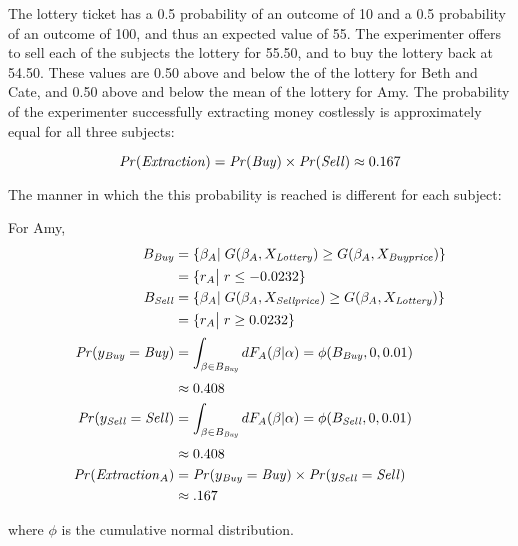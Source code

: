 The lottery ticket has a 0.5 probability of an outcome of 10 and a 0.5 probability of an outcome of 100, and thus an expected value of 55.
The experimenter offers to sell each of the subjects the lottery for 55.50, and to buy the lottery back at 54.50.
These values are 0.50 above and below the {\CE} of the lottery for Beth and Cate, and  0.50 above and below the mean {\CE} of the lottery for Amy.
The probability of the experimenter successfully extracting money costlessly is approximately equal for all three subjects:

\begin{equation}
	\label{eq:pr.extraction}
	{\ensuremath{\mathit{Pr}}}(\mathit{Extraction}) = {\mathit{Pr}}(\mathit{Buy}) \times {\ensuremath{\mathit{Pr}}}(\mathit{Sell}) \approx 0.167
\end{equation}

\noindent The manner in which the this probability is reached is different for each subject:

\noindent For Amy,
\begin{align}
	\label{eq:Amy}
	\begin{split}
		B_{\mathit{Buy}} &= \{ \beta_A |\; G(\beta_A,X_{\mathit{Lottery}}) \geq G(\beta_A,X_{\mathit{Buy price}})\}\\
		&= \{ r_A \big|\; r \leq -0.0232 \} \\
		B_{\mathit{Sell}} &= \{ \beta_A |\; G(\beta_A,X_{\mathit{Sell price}}) \geq G(\beta_A,X_{\mathit{Lottery}})\}\\
		&= \{ r_A \big|\; r \geq 0.0232 \} \\[0.5ex]
		{\ensuremath{\mathit{Pr}}}(y_{\mathit{Buy}}=\mathit{Buy}) &= \int_{\beta \in B_{\mathit{Buy}}} dF_A(\beta|\alpha) = \phi(B_{\mathit{Buy}},0,0.01)\\[0.5ex]
		&\approx 0.408 \\
		{\mathit{Pr}}(y_{\mathit{Sell}}=\mathit{Sell}) &= \int_{\beta \in B_{\mathit{Buy}}} dF_A(\beta|\alpha) = \phi(B_{\mathit{Sell}},0,0.01)\\[0.5ex]
		&\approx 0.408 \\
		{\mathit{Pr}}(\mathit{Extraction}_A) &= {\mathit{Pr}}(y_{\mathit{Buy}} = \mathit{Buy}) \times {\ensuremath{\mathit{Pr}}}(y_{\mathit{Sell}} = \mathit{Sell})\\
		&\approx .167
	\end{split}
\end{align}

\noindent where $\phi$ is the cumulative normal distribution.

